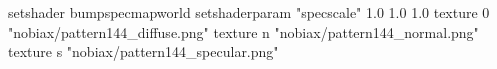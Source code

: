 setshader bumpspecmapworld
setshaderparam "specscale" 1.0 1.0 1.0
   texture 0 "nobiax/pattern144_diffuse.png"
   texture n "nobiax/pattern144_normal.png"
   texture s "nobiax/pattern144_specular.png"